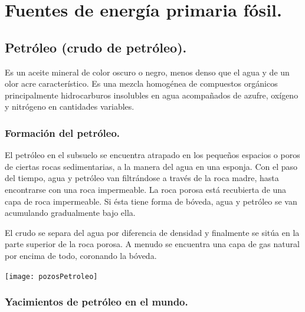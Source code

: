 \section{Fuentes de energía primaria fósil.}
	\subsection{Petróleo (crudo de petróleo).}
		Es un aceite mineral de color oscuro o negro, menos denso que el agua y de un olor acre característico. Es una mezcla homogénea de compuestos orgánicos principalmente hidrocarburos insolubles en agua acompañados de azufre, oxígeno y nitrógeno en cantidades variables.
		
		\subsubsection{Formación del petróleo.}
			El petróleo en el subsuelo se encuentra atrapado en los pequeños espacios o poros de ciertas rocas
			sedimentarias, a la manera del agua en una esponja. Con el paso del tiempo, agua y petróleo van filtrándose a través de la roca madre, hasta encontrarse con una roca impermeable. La roca porosa está recubierta de una capa de roca impermeable. Si ésta tiene forma de bóveda, agua y petróleo se van acumulando gradualmente bajo ella.
			
			
			El crudo se separa del agua por
			diferencia de densidad y
			finalmente se sitúa en la parte
			superior de la roca porosa.
			A menudo se encuentra una capa
			de gas natural por encima de todo,
			coronando la bóveda.
			
			\begin{center}
				\texttt{[image: pozosPetroleo]}
			\end{center}
			
		\subsubsection{Yacimientos de petróleo en el mundo.}
			\begin{center}
			\end{center}
			
